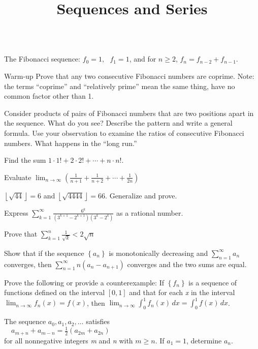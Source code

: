 \documentclass{article}
\begin{document}
\title{Sequences and Series}
\author{}
\date{}
\maketitle

\begin{doublespace}
\noindent\(\pmb{\text{}}\)
\end{doublespace}



The Fibonacci sequence: { } \(f_0=1,\text{  }f_1= 1\), and for \(n\geq 2\), \(f_n= f_{n-2}+f_{n-1}\).



Warm-up { }Prove that any two consecutive Fibonacci numbers are coprime. { }Note: { }the terms {``}coprime{''} { }and { }{``}relatively prime{''}
{ }mean the same thing, have no common factor other than 1.

 Consider products of pairs of Fibonacci numbers that are two positions apart in the sequence. { }What do you see? { }Describe the pattern and write
a general formula. { }Use your observation to examine the ratios of consecutive Fibonacci numbers. { } What happens in the {``}long run.{''}

 { }Find the sum { }\(1\cdot 1! + 2\cdot 2! + \cdots +n\cdot n!\).

 { }Evaluate { }\(\lim_{n\to \infty }  \left(\frac{1}{n+1}+ \frac{1}{n+2}+ \cdots +\frac{1}{2n}\right)\)

 { }\(\left\lfloor \sqrt{44}\right\rfloor =6\) and { } \(\left\lfloor \sqrt{4444}\right\rfloor =66\). { }Generalize and prove.

Express \(\sum _{k=1}^{\infty } \frac{6^k}{\left(3^{k+1}-2^{k+1}\right) \left(3^k-2^k\right)}\) as a rational number.

 Prove that \(\sum _{k=1}^n \frac{1}{\sqrt{k}}<2\sqrt{n}\)

Show that if the sequence \(\left\{a_n\right\}\) is monotonically decreasing and \(\sum _{n=1}^{\infty } a_n\) converges, then \(\sum _{n=1}^{\infty
} n \left(a_n-a_{n+1}\right)\) converges and the two sums are equal.

 Prove the following or provide a counterexample: { }If \(\left\{f_n\right\}\) is a sequence of functions defined on the interval \([0,1]\) and that
for each \textit{ x} in the interval \(\lim_{n\to \infty } f_n(x) = f(x)\), { }then { } { }\(\lim_{n\to \infty } \int_0^1 f_n(x) \, dx=\int_0^1 f(x)
\, dx\).

 { }The sequence \(a_0, a_1, a_2,\ldots\) satisfies\\
$\quad $\(a_{m+n}+a_{m-n}=\frac{1}{2}\left(a_{2m}+a_{2n}\right)\)\\
for all nonnegative integers \textit{ m} and \textit{ n} with \(m\geq n\). { }If \(a_1= 1\), determine \(a_n\).
\end{document}
